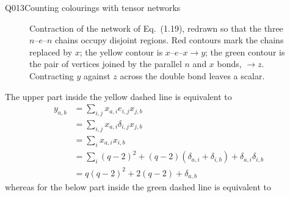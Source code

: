 \begin{entry}{Q013}{Counting colourings with tensor networks}
\begin{solution}[Part (a)]
\begin{figure}[H]
{}
\caption{Contraction of the network of Eq.~(1.19), redrawn so that the three
$n$--$e$--$n$ chains occupy disjoint regions. Red contours mark the chains replaced by
$x$; the yellow contour is $x$--$e$--$x\to y$; the green contour is the pair of vertices
joined by the parallel $n$ and $x$ bonds, $\to z$. Contracting $y$ against $z$ across the
double bond leaves a scalar.}
\end{figure}%

The upper part inside the yellow dashed line is equivalent to 
\begin{equation}
\begin{split}
    y_{a,b}&= \sum_{i,j}x_{a,i}e_{i,j}x_{j,b}\\
    &=\sum_{i,j} x_{a,i}\delta_{i,j}x_{j,b}\\
    &= \sum_{i} x_{a,i}x_{i,b}\\
    &= \sum_i (q-2)^2 + (q-2)(\delta_{a,i}+\delta_{i,b}) + \delta_{a,i}\delta_{i,b}\\
    &= q(q-2)^2+ 2(q-2) + \delta_{a,b}
\end{split}
\end{equation}
whereas for the below part inside the green dashed line is equivalent to 


\end{solution}
\end{entry}
